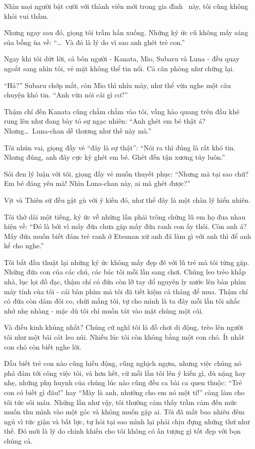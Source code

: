 \documentclass[../main.tex]{subfiles}
\begin{document}
Nhìn mọi người bật cười với thành viên mới trong gia đình \hll\ này, tôi cũng không khỏi vui thầm.

Nhưng ngay sau đó, giọng tôi trầm hẳn xuống. Những ký ức cũ không mấy sáng sủa bỗng ùa về: ``\dots\ Và đó là lý do vì sao anh ghét trẻ con.''

Ngay khi tôi dứt lời, cả bốn người - Kanata, Mio, Subaru và Luna - đều quay ngoắt sang nhìn tôi, vẻ mặt không thể tin nổi. Cả căn phòng như chững lại.

``Hả?'' Subaru chớp mắt, còn Mio thì nhíu mày, như thể vừa nghe một câu chuyện khó tin. ``Anh vừa nói cái gì cơ?''

Thậm chí đến Kanata cũng chằm chằm vào tôi, vầng hào quang trên đầu khẽ rung lên như đang bày tỏ sự ngạc nhiên: ``Anh ghét em bé thật á? Nhưng\dots\ Luna-chan dễ thương như thế này mà.''

Tôi nhún vai, giọng đầy vẻ ``đây là sự thật'': ``Nói ra thì đúng là rất khó tin. Nhưng đúng, anh đây cực kỳ ghét em bé. Ghét đến tận xương tủy luôn.''

Sói đen lý luận với tôi, giọng đầy vẻ muốn thuyết phục: ``Nhưng mà tại sao chứ? Em bé đáng yêu mà! Nhìn Luna-chan này, ai mà ghét được?''

Vịt và Thiên sứ đều gật gù với ý kiến đó, như thể đây là một chân lý hiển nhiên.

Tôi thở dài một tiếng, ký ức về những lần phải trông chừng lũ em họ đua nhau hiện về: ``Đó là bởi vì mấy đứa chưa gặp mấy đứa ranh con ấy thôi. Còn anh á? Mấy đứa muốn biết đám trẻ ranh ở Etsunan xứ anh đã làm gì với anh thì để anh kể cho nghe.''

Tôi bắt đầu thuật lại những ký ức không mấy đẹp đẽ với lũ trẻ mà tôi từng gặp. Những đứa con của các chú, các bác tôi mỗi lần sang chơi. Chúng leo trèo khắp nhà, lục lọi đồ đạc, thậm chí có đứa còn lỡ tay đổ nguyên ly nước lên bàn phím máy tính của tôi - cái bàn phím mà tôi đã tiết kiệm cả tháng để mua. Thậm chí có đứa còn dám đôi co, chửi mắng tôi, tự cho mình là ta đây mỗi lần tôi nhắc nhở nhẹ nhàng - mặc dù tôi chỉ muốn tát vào mặt chúng một cái.

Và điều kinh khủng nhất? Chúng cứ nghĩ tôi là đồ chơi di động, trèo lên người tôi như một bãi cát leo núi. Nhiều lúc tôi còn không bằng một con chó. Ít nhất con chó còn biết nghe lời.

Dẫu biết trẻ con nào cũng hiếu động, cũng nghịch ngợm, nhưng việc chúng nó phá đám tới công việc tôi, và hơn hết, cứ mỗi lần tôi lên ý kiến gì, dù nặng hay nhẹ, những phụ huynh của chúng lúc nào cũng đều ca bài ca quen thuộc: ``Trẻ con có biết gì đâu!'' hay ``Mày là anh, nhường cho em nó một tí!'' càng làm cho tôi tức sôi máu. Những lần như vậy, tôi thường cảm thấy trầm cảm đến mức muốn thu mình vào một góc và không muốn gặp ai. Tôi đã mất bao nhiêu đêm ngủ vì tức giận và bất lực, tự hỏi tại sao mình lại phải chịu đựng những thứ như thế. Đó mới là lý do chính khiến cho tôi không có ấn tượng gì tốt đẹp với bọn chúng cả.
\end{document}
